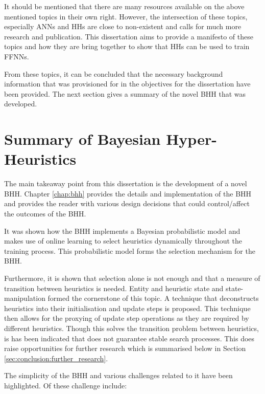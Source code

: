 It should be mentioned that there are many resources available on the above mentioned topics in their own right. However, the intersection of these topics, especially \acp{ANN} and \acp{HH} are close to non-existent and calls for much more research and publication. This dissertation aims to provide a manifesto of these topics and how they are bring together to show that \acp{HH} can be used to train \acp{FFNN}.

From these topics, it can be concluded that the necessary background information that was provisioned for in the objectives for the dissertation have been provided. The next section gives a summary of the novel \ac{BHH} that was developed.


\section{Summary of Bayesian Hyper-Heuristics}
\label{sec:conclusion:bhh}

The main takeaway point from this dissertation is the development of a novel \ac{BHH}. Chapter \ref{chap:bhh} provides the details and implementation of the \ac{BHH} and provides the reader with various design decisions that could control/affect the outcomes of the \ac{BHH}.

It was shown how the \ac{BHH} implements a Bayesian probabilistic model and makes use of online learning to select heuristics dynamically throughout the training process. This probabilistic model forms the selection mechanism for the \ac{BHH}.

Furthermore, it is shown that selection alone is not enough and that a measure of transition between heuristics is needed. Entity and heuristic state and state-manipulation formed the cornerstone of this topic. A technique that deconstructs heuristics into their initialisation and update steps is proposed. This technique then allows for the proxying of update step operations as they are required by different heuristics. Though this solves the transition problem between heuristics, is has been indicated that does not guarantee stable search processes. This does raise opportunities for further research which is summarised below in Section \ref{sec:conclusion:further_research}.

The simplicity of the \ac{BHH} and various challenges related to it have been highlighted. Of these challenge include:

